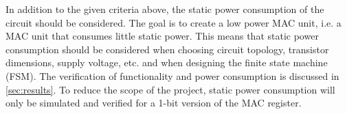 In addition to the given criteria above, the static power consumption of the circuit should be considered. The goal is to create a low power MAC unit, i.e. a MAC unit that consumes little static power. This means that static power consumption should be considered when choosing circuit topology, transistor dimensions, supply voltage, etc. and when designing the finite state machine (FSM). The verification of functionality and power consumption is discussed in \autoref{sec:results}. To reduce the scope of the project, static power consumption will only be simulated and verified for a 1-bit version of the MAC register.